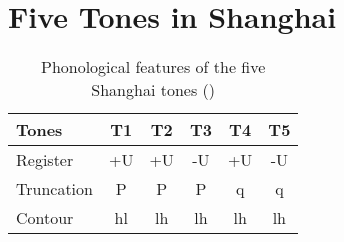 \documentclass[11pt]{article}
\begin{document}
\section{Five Tones in Shanghai}

\begin{table}[h!]
	\centering
	\caption{Phonological features of the five Shanghai tones (\citep{zhu1999shanghai})} 
	\begin{tabular}{lccccc}
		\toprule
		\textbf{Tones} & \textbf{T1} & \textbf{T2} & \textbf{T3} & \textbf{T4} & \textbf{T5} \\
		\midrule
		Register   & +U & +U & -U & +U & -U \\
		Truncation & P  & P  & P  & q  & q  \\
		Contour    & hl & lh & lh & lh & lh \\
		\bottomrule
	\end{tabular}
\end{table}




\end{document}
